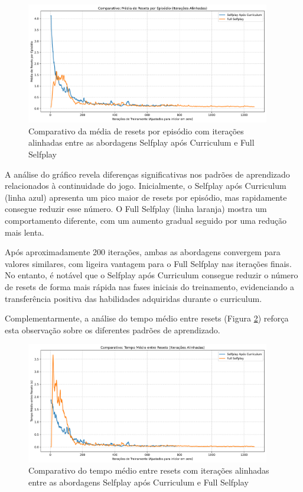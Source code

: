 \begin{figure}[H]
    \centering
    \includegraphics[width=0.95\textwidth]{fig/graficos_trabalho/graficos_experimentos/geral/comparativo_resets_episodio_alinhado.png}
    \caption{Comparativo da média de resets por episódio com iterações alinhadas entre as abordagens Selfplay após Curriculum e Full Selfplay}
    \label{fig:total_resets}
\end{figure}

A análise do gráfico revela diferenças significativas nos padrões de aprendizado relacionados à continuidade do jogo. Inicialmente, o Selfplay após Curriculum (linha azul) apresenta um pico maior de resets por episódio, mas rapidamente consegue reduzir esse número. O Full Selfplay (linha laranja) mostra um comportamento diferente, com um aumento gradual seguido por uma redução mais lenta.

Após aproximadamente 200 iterações, ambas as abordagens convergem para valores similares, com ligeira vantagem para o Full Selfplay nas iterações finais. No entanto, é notável que o Selfplay após Curriculum consegue reduzir o número de resets de forma mais rápida nas fases iniciais do treinamento, evidenciando a transferência positiva das habilidades adquiridas durante o curriculum.

Complementarmente, a análise do tempo médio entre resets (Figura \ref{fig:time_between_resets}) reforça esta observação sobre os diferentes padrões de aprendizado.

\begin{figure}[H]
    \centering
    \includegraphics[width=0.95\textwidth]{fig/graficos_trabalho/graficos_experimentos/geral/comparativo_tempo_entre_resets_alinhado.png}
    \caption{Comparativo do tempo médio entre resets com iterações alinhadas entre as abordagens Selfplay após Curriculum e Full Selfplay}
    \label{fig:time_between_resets}
\end{figure}

